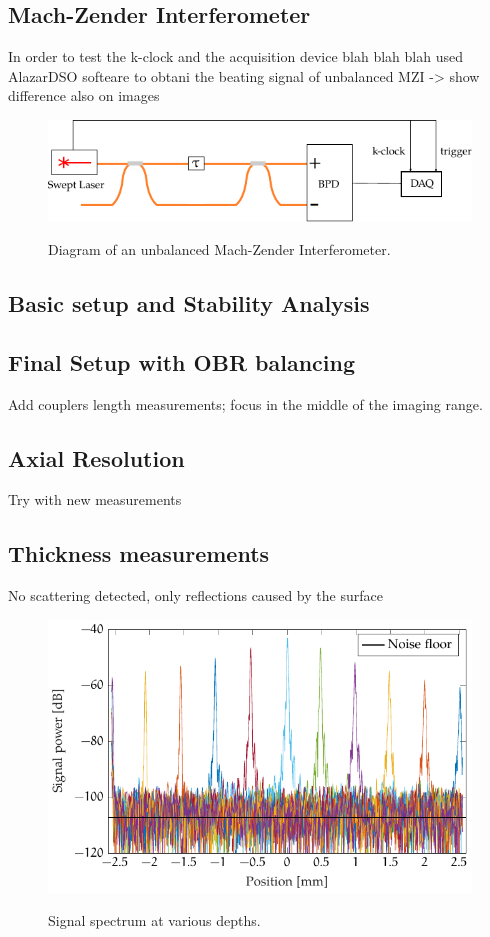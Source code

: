 \subsection{ Mach-Zender Interferometer }
In order to test the k-clock and the acquisition device blah blah blah used AlazarDSO softeare to obtani the beating signal of unbalanced MZI -> show difference also on images
\begin{figure}[bth]
	\myfloatalign
	{\includegraphics[width=\linewidth]{gfx/setup-diagrams/interferometer.pdf}}
	\caption{Diagram of an unbalanced Mach-Zender Interferometer.}\label{fig:unbalanced-mzi}
\end{figure}

\subsection{Basic setup and Stability Analysis}


\subsection{Final Setup with OBR balancing}
Add couplers length measurements;  focus in the middle of the imaging range. 

\subsection{Axial Resolution}
Try with new measurements

\subsection{Thickness measurements}
No scattering detected, only reflections caused by the surface


\begin{figure}[hbt]
\myfloatalign
{\includegraphics[width=\linewidth]{gfx/falloff}}
\caption{Signal spectrum at various depths.}\label{fig:power-falloff}
\end{figure}


